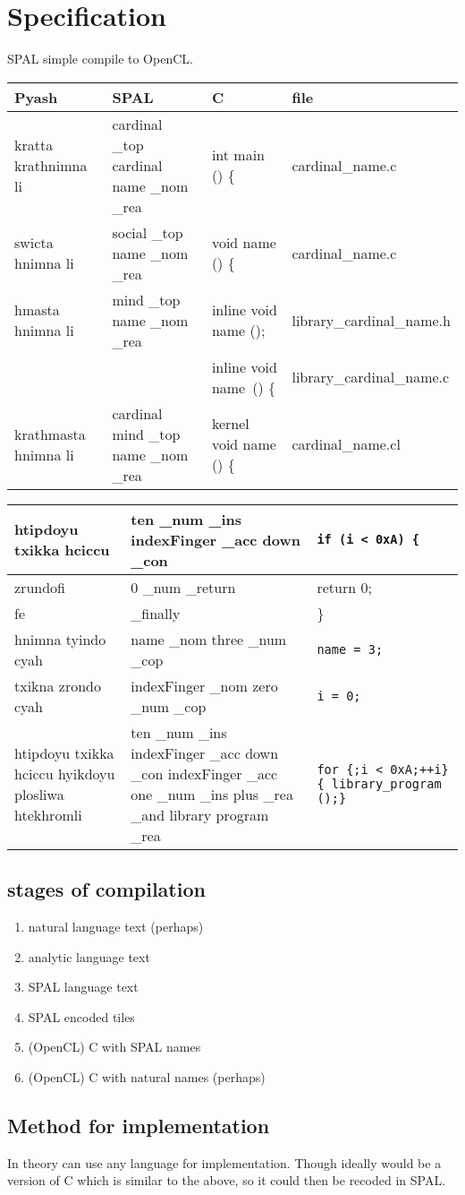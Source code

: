 \chapter{Specification}
SPAL simple compile to OpenCL.\@

\begin{sidewaystable}
\begin{tabulary}{\textwidth}{L|L|L|L}
Pyash & SPAL & C & file \\
\midrule 
\midrule 
kratta krathnimna li &
cardinal  \_top cardinal name \_nom \_rea & int main () \{ & 
cardinal\_name.c \\
\midrule
swicta hnimna li &
social \_top name \_nom \_rea & void name () \{ & cardinal\_name.c \\
\midrule
hmasta hnimna li&
mind \_top name \_nom \_rea & inline void name (); &
library\_cardinal\_name.h \\
& & inline void name\ () \{ & library\_cardinal\_name.c \\
\midrule
krathmasta hnimna li &
cardinal mind \_top name \_nom \_rea & kernel void name () \{ &
cardinal\_name.cl \\
\end{tabulary}
\begin{tabulary}{\textwidth}{L|L|L}
\toprule
htipdoyu txikka hciccu &
ten \_num \_ins indexFinger \_acc down \_con & \texttt{if (i < 0xA) \{} \\
\midrule 
zrundofi  & 
0 \_num \_return & return 0; \\
\midrule
fe & 
\_finally & \} \\
\midrule
hnimna tyindo cyah &
name \_nom three \_num \_cop & \texttt{name = 3;} \\
\midrule 
txikna zrondo cyah &
indexFinger \_nom zero \_num \_cop & \texttt{i = 0;} \\
\midrule 
htipdoyu txikka hciccu hyikdoyu plosliwa htekhromli&
ten \_num \_ins indexFinger \_acc down \_con 
indexFinger \_acc one \_num \_ins plus \_rea \_and library program \_rea & 
\texttt{for \{;i < 0xA;\@ ++i\}\{ library\_program ();\}}  \\
\end{tabulary}
\end{sidewaystable}


\section{stages of compilation}

\begin{enumerate}
  \item natural language text (perhaps)
  \item analytic language text
  \item SPAL language text
  \item SPAL encoded tiles
  \item (OpenCL) C with SPAL names
  \item (OpenCL) C with natural names (perhaps)
\end{enumerate}

\section{Method for implementation}
In theory can use any language for implementation.  
Though ideally would be a version of C which is similar to the above, 
so it could then be recoded in SPAL.\@



